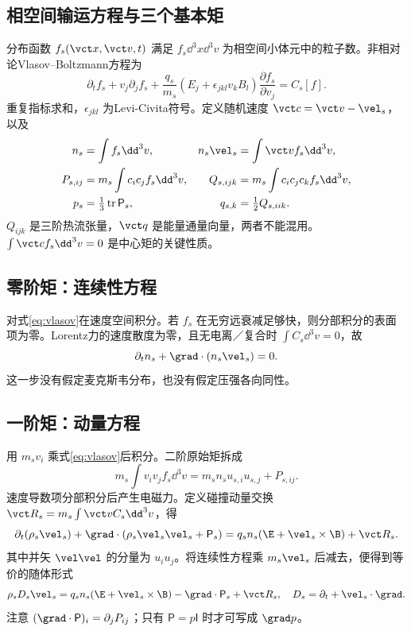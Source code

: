 \subsection{相空间输运方程与三个基本矩}
分布函数 $f_s(\vct x,\vct v,t)$ 满足 $f_s\dd^3x\dd^3v$ 为相空间小体元中的粒子数。非相对论Vlasov--Boltzmann方程为
\begin{equation}
\partial_tf_s+v_j\partial_jf_s+\frac{q_s}{m_s}(E_j+\epsilon_{jkl}v_kB_l)\frac{\partial f_s}{\partial v_j}=C_s[f].\label{eq:vlasov}
\end{equation}
重复指标求和，$\epsilon_{jkl}$ 为Levi-Civita符号。定义随机速度 $\vct c=\vct v-\vel_s$，以及
\begin{align}
n_s&=\int f_s\dd^3v,& n_s\vel_s&=\int\vct v f_s\dd^3v,\\
P_{s,ij}&=m_s\int c_ic_jf_s\dd^3v,&Q_{s,ijk}&=m_s\int c_ic_jc_kf_s\dd^3v,\\
p_s&=\tfrac13\operatorname{tr}\mathsf P_s,&q_{s,k}&=\tfrac12 Q_{s,iik}.
\end{align}
$Q_{ijk}$ 是三阶热流张量，$\vct q$ 是能量通量向量，两者不能混用。$\int\vct c f_s\dd^3v=0$ 是中心矩的关键性质。

\subsection{零阶矩：连续性方程}
对式\eqref{eq:vlasov}在速度空间积分。若 $f_s$ 在无穷远衰减足够快，则分部积分的表面项为零。Lorentz力的速度散度为零，且无电离／复合时 $\int C_s\dd^3v=0$，故
\begin{equation}\partial_tn_s+\grad\cdot(n_s\vel_s)=0.\label{eq:continuity}\end{equation}
这一步没有假定麦克斯韦分布，也没有假定压强各向同性。

\subsection{一阶矩：动量方程}
用 $m_sv_i$ 乘式\eqref{eq:vlasov}后积分。二阶原始矩拆成
\begin{equation}m_s\int v_iv_jf_s\dd^3v=m_sn_su_{s,i}u_{s,j}+P_{s,ij}.
\end{equation}
速度导数项分部积分后产生电磁力。定义碰撞动量交换 $\vct R_s=m_s\int\vct v C_s\dd^3v$，得
\begin{equation}
\partial_t(\rho_s\vel_s)+\grad\cdot(\rho_s\vel_s\vel_s+\mathsf P_s)
=q_sn_s(\E+\vel_s\times\B)+\vct R_s.\label{eq:momentum}
\end{equation}
其中并矢 $\vel\vel$ 的分量为 $u_iu_j$。将连续性方程乘 $m_s\vel_s$ 后减去，便得到等价的随体形式
\begin{equation}\rho_sD_s\vel_s=q_sn_s(\E+\vel_s\times\B)-\grad\cdot\mathsf P_s+\vct R_s,
\quad D_s=\partial_t+\vel_s\cdot\grad.\label{eq:speciesmom}\end{equation}
注意 $(\grad\cdot\mathsf P)_i=\partial_jP_{ij}$；只有 $\mathsf P=p\mathsf I$ 时才可写成 $\grad p$。


